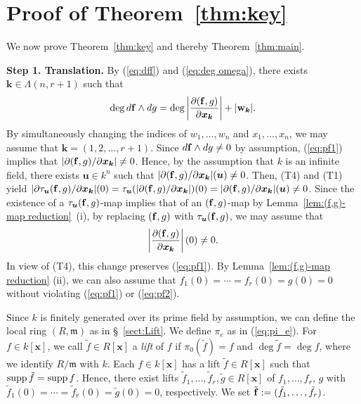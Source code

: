 \documentclass{amsart}
\theoremstyle{plain}
\theoremstyle{definition}
\newcommand{\fm }{{\mathfrak{m}}}
\newcommand{\nd}{\noindent}
\newcommand{\x}{{\boldsymbol x}}
\newcommand{\w}{{\bf w}}
\newcommand{\bk}{{\boldsymbol k}}
\newcommand{\bu}{{\boldsymbol u}}
\newcommand{\ff}{{\bf f}}
\newcommand{\kx}{k[\x]}
\newcommand{\Rx}{R[\x]}
\newcommand{\degw  }{\deg}
\newcommand{\supp }{\mathop{\rm supp}\nolimits}
\begin{document}
\section{Proof of Theorem~\ref{thm:key}}\label{sect:Proof of pSU}
\setcounter{equation}{0}


We now prove Theorem~\ref{thm:key} 
and thereby Theorem~\ref{thm:main}. 


\nd 
{\bf Step 1. Translation.} 
By (\ref{eq:dff}) and (\ref{eq:deg omega}), 
there exists $\bk \in \Lambda (n,r+1)$ such that 
\begin{equation}\label{eq:pf1}
\degw d\ff \wedge dg=
\degw 
\left|
\dfrac{\partial (\ff ,g)}{\partial \x _{\bk }}
\right|+|\w _{\bk }|. 
\end{equation}
By simultaneously changing the indices of 
$w_1,\ldots ,w_n$ and $x_1,\ldots ,x_n$, 
we may assume that 
$\bk =(1,2,\ldots ,r+1)$. 
Since $d\ff \wedge dg\ne 0$ by assumption, 
(\ref{eq:pf1}) implies that 
$|\partial (\ff ,g)/\partial \x _{\bk }|\ne 0$. 
Hence, by the assumption that $k$ is an infinite field, 
there exists $\bu \in k^n$ such that 
$|\partial (\ff ,g)/\partial \x _{\bk }|(\bu )\ne 0$. 
Then, 
(T4) and (T1) yield 
$|\partial \tau _{\bu }(\ff ,g)/\partial \x _{\bk }|(0)
=\tau _{\bu }(|\partial (\ff ,g)/\partial \x _{\bk }|)(0)
=|\partial (\ff ,g)/\partial \x _{\bk }|(\bu )\ne 0$. 
Since the existence of a $\tau _{\bu }(\ff ,g)$-map implies 
that of an $(\ff ,g)$-map by Lemma~\ref{lem:(f,g)-map reduction}~(i), 
by replacing $(\ff ,g)$ with $\tau _{\bu }(\ff ,g)$, 
we may assume that 
\begin{equation}\label{eq:pf2}
\left|
\dfrac{\partial (\ff ,g)}{\partial \x _{\bk }}
\right|(0)\ne 0. 
\end{equation}
In view of (T4), 
this change preserves (\ref{eq:pf1}). 
By Lemma~\ref{lem:(f,g)-map reduction} (ii), 
we can also assume that $f_1(0)=\cdots =f_r(0)=g(0)=0$ 
without violating (\ref{eq:pf1}) or (\ref{eq:pf2}). 



\nd {\bf Step 2. Lift.} 
Since $k$ is finitely generated over its prime field by assumption, 
we can define the local ring $(R,\fm )$ as in \S~\ref{sect:Lift}. 
We define $\pi _e$ as in (\ref{eq:pi_e}). 
For $f\in \kx $, 
we call $\tilde{f}\in \Rx $ a {\it lift} of $f$ 
if $\pi _0(\tilde{f})=f$ and $\degw \tilde{f}=\degw f$, 
where we identify $R/\fm $ with $k$. 
Each $f\in \kx $ has a 
lift $\tilde{f}\in \Rx $ such that $\supp \tilde{f}=\supp f$. 
Hence, 
there exist lifts 
$\tilde{f}_1,\ldots ,\tilde{f}_r,\tilde{g}\in \Rx $ 
of $f_1,\ldots ,f_r$, $g$ 
with $\tilde{f}_1(0)=\cdots =\tilde{f}_r(0)=\tilde{g}(0)=0$, 
respectively. 
We set $\tilde{\ff }:=(\tilde{f}_1,\ldots ,\tilde{f}_r)$. 
\end{document}
